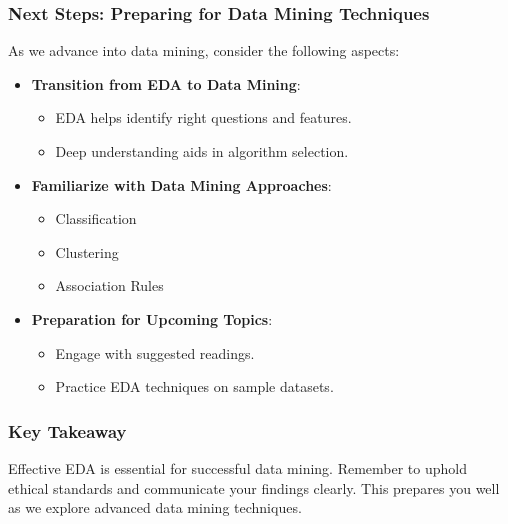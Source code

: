 \documentclass[aspectratio=169]{beamer}
\begin{document}
\begin{frame}[fragile]
    \frametitle{Next Steps: Preparing for Data Mining Techniques}
    As we advance into data mining, consider the following aspects:
    \begin{itemize}
        \item \textbf{Transition from EDA to Data Mining}:
        \begin{itemize}
            \item EDA helps identify right questions and features.
            \item Deep understanding aids in algorithm selection.
        \end{itemize}
        \item \textbf{Familiarize with Data Mining Approaches}:
        \begin{itemize}
            \item Classification 
            \item Clustering
            \item Association Rules
        \end{itemize}
        \item \textbf{Preparation for Upcoming Topics}:
        \begin{itemize}
            \item Engage with suggested readings.
            \item Practice EDA techniques on sample datasets.
        \end{itemize}
    \end{itemize}
\end{frame}

\begin{frame}[fragile]
    \frametitle{Key Takeaway}
    Effective EDA is essential for successful data mining. Remember to uphold ethical standards and communicate your findings clearly. This prepares you well as we explore advanced data mining techniques.
\end{frame}
\end{document}
